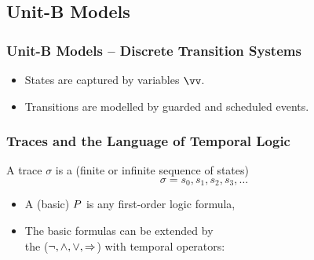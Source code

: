 \subsection{Unit-B Models}
\label{sec:unit-b-models}

\begin{frame}
  \frametitle{Unit-B Models -- Discrete Transition Systems}

  \begin{itemize}
  \item States are captured by \alert{variables $\vv$}.
    \medskip
  \item Transitions are modelled by \alert{guarded and scheduled events}.
  \end{itemize}

\end{frame}

\begin{frame}
  \frametitle{Traces and the Language of Temporal Logic}

  \begin{alertblock}{}
    A trace $\sigma$ is a (finite or infinite sequence of states)
    \[\sigma = s_0, s_1, s_2, s_3, \ldots\]
  \end{alertblock}

  \begin{itemize}
  \item A (basic)  $P$ is any
    \alert{first-order logic formula},
    \medskip
  \item The basic formulas can be extended by  \\
    \quad the  ($\neg, \land, \lor, \mathbin\Rightarrow$) with
    \alert{temporal operators}:
    \medskip
    \begin{center}
      
    \end{center}
    \begin{center}
      
    \end{center}
  \end{itemize}
\end{frame}

